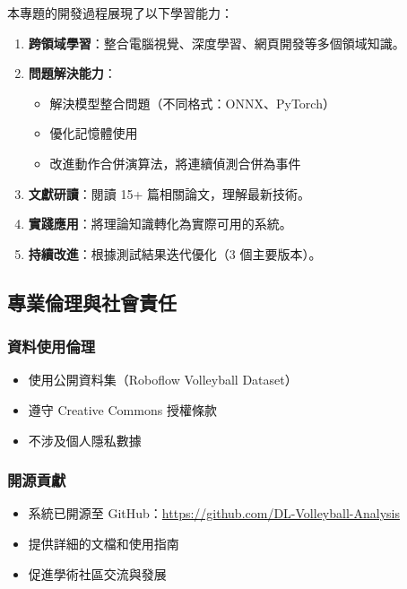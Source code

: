 \documentclass[a4paper,14pt,oneside]{article}
\begin{document}
本專題的開發過程展現了以下學習能力：

\begin{enumerate}
    \item \textbf{跨領域學習}：整合電腦視覺、深度學習、網頁開發等多個領域知識。
    
    \item \textbf{問題解決能力}：
    \begin{itemize}
        \item 解決模型整合問題（不同格式：ONNX、PyTorch）
        \item 優化記憶體使用
        \item 改進動作合併演算法，將連續偵測合併為事件
    \end{itemize}
    
    \item \textbf{文獻研讀}：閱讀 15+ 篇相關論文，理解最新技術。
    
    \item \textbf{實踐應用}：將理論知識轉化為實際可用的系統。
    
    \item \textbf{持續改進}：根據測試結果迭代優化（3 個主要版本）。
\end{enumerate}

\subsection{專業倫理與社會責任}

\subsubsection{資料使用倫理}
\begin{itemize}
    \item 使用公開資料集（Roboflow Volleyball Dataset）
    \item 遵守 Creative Commons 授權條款
    \item 不涉及個人隱私數據
\end{itemize}

\subsubsection{開源貢獻}
\begin{itemize}
    \item 系統已開源至 GitHub：\url{https://github.com/DL-Volleyball-Analysis}
    \item 提供詳細的文檔和使用指南
    \item 促進學術社區交流與發展
\end{itemize}
\end{document}
